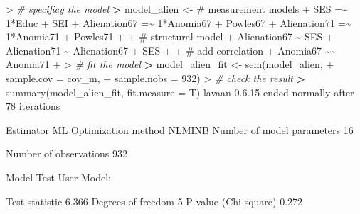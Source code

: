 \documentclass[
]{article}
\newenvironment{Shaded}{\begin{snugshade}}{\end{snugshade}}
\newcommand{\AttributeTok}[1]{\textcolor[rgb]{0.77,0.63,0.00}{#1}}
\newcommand{\CommentTok}[1]{\textcolor[rgb]{0.56,0.35,0.01}{\textit{#1}}}
\newcommand{\DecValTok}[1]{\textcolor[rgb]{0.00,0.00,0.81}{#1}}
\newcommand{\ErrorTok}[1]{\textcolor[rgb]{0.64,0.00,0.00}{\textbf{#1}}}
\newcommand{\FloatTok}[1]{\textcolor[rgb]{0.00,0.00,0.81}{#1}}
\newcommand{\FunctionTok}[1]{\textcolor[rgb]{0.00,0.00,0.00}{#1}}
\newcommand{\NormalTok}[1]{#1}
\newcommand{\OtherTok}[1]{\textcolor[rgb]{0.56,0.35,0.01}{#1}}
\newcommand{\SpecialCharTok}[1]{\textcolor[rgb]{0.00,0.00,0.00}{#1}}
\newcommand{\StringTok}[1]{\textcolor[rgb]{0.31,0.60,0.02}{#1}}
\begin{document}
\begin{Shaded}
\begin{Highlighting}[]
\SpecialCharTok{\textgreater{}} \CommentTok{\# specificy the model}
\ErrorTok{\textgreater{}}\NormalTok{ model\_alien }\OtherTok{\textless{}{-}} \StringTok{\textquotesingle{}\# measurement models}
\StringTok{+                 SES =\textasciitilde{} 1*Educ + SEI}
\StringTok{+                 Alienation67 =\textasciitilde{} 1*Anomia67 + Powles67}
\StringTok{+                 Alienation71 =\textasciitilde{} 1*Anomia71 + Powles71}
\StringTok{+                 }
\StringTok{+                 \# structural model}
\StringTok{+                 Alienation67 \textasciitilde{} SES}
\StringTok{+                 Alienation71 \textasciitilde{} Alienation67 + SES}
\StringTok{+                 }
\StringTok{+                 \# add correlation}
\StringTok{+                 Anomia67 \textasciitilde{}\textasciitilde{} Anomia71}
\StringTok{+                 \textquotesingle{}}
\SpecialCharTok{\textgreater{}} \CommentTok{\# fit the model}
\ErrorTok{\textgreater{}}\NormalTok{ model\_alien\_fit }\OtherTok{\textless{}{-}} \FunctionTok{sem}\NormalTok{(model\_alien, }
\SpecialCharTok{+}                        \AttributeTok{sample.cov =}\NormalTok{ cov\_m, }
\SpecialCharTok{+}                        \AttributeTok{sample.nobs =} \DecValTok{932}\NormalTok{)}
\SpecialCharTok{\textgreater{}} \CommentTok{\# check the result}
\ErrorTok{\textgreater{}} \FunctionTok{summary}\NormalTok{(model\_alien\_fit, }\AttributeTok{fit.measure =}\NormalTok{ T)}
\NormalTok{lavaan }\DecValTok{0}\NormalTok{.}\FloatTok{6.15}\NormalTok{ ended normally after }\DecValTok{78}\NormalTok{ iterations}

\NormalTok{  Estimator                                         ML}
\NormalTok{  Optimization method                           NLMINB}
\NormalTok{  Number of model parameters                        }\DecValTok{16}

\NormalTok{  Number of observations                           }\DecValTok{932}

\NormalTok{Model Test User Model}\SpecialCharTok{:}
                                                      
\NormalTok{  Test statistic                                 }\FloatTok{6.366}
\NormalTok{  Degrees of freedom                                 }\DecValTok{5}
\NormalTok{  P}\SpecialCharTok{{-}}\FunctionTok{value}\NormalTok{ (Chi}\SpecialCharTok{{-}}\NormalTok{square)                           }\FloatTok{0.272}


\end{Highlighting}
\end{Shaded}
\end{document}
